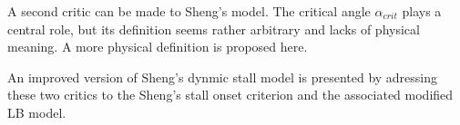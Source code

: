 A second critic can be made to Sheng's model. The critical angle $\alpha_{crit}$ plays a central role, but its definition seems rather arbitrary and lacks of physical meaning. A more physical definition is proposed here. 

An improved version of Sheng's dynmic stall model is presented by adressing these two critics to the Sheng's stall onset criterion and the associated modified LB model.


 


